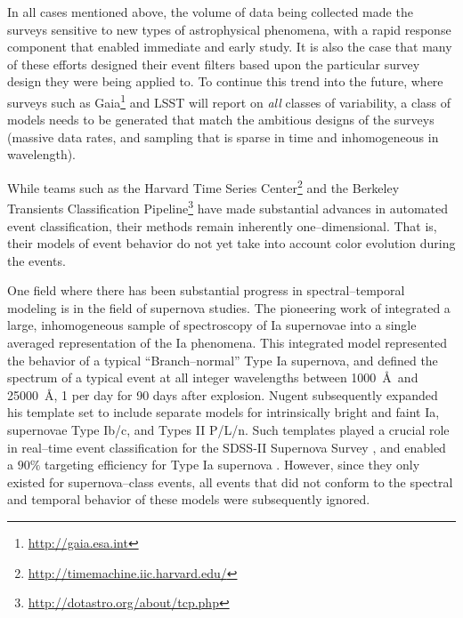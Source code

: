 In all cases mentioned above, the volume of data being collected made the
surveys sensitive to new types of astrophysical phenomena, with a rapid response
component that enabled immediate and early study.  It is also the case that many
of these efforts designed their event filters based upon the particular survey
design they were being applied to.  To continue this trend into the future,
where surveys such as Gaia\footnote{\url{http://gaia.esa.int}} and LSST will
report on {\it all} classes of variability, a class of models needs to be
generated that match the ambitious designs of the surveys (massive data rates,
and sampling that is sparse in time and inhomogeneous in wavelength).

 \smallskip

While teams such as the Harvard Time Series
Center\footnote{\url{http://timemachine.iic.harvard.edu/}} and the Berkeley
Transients Classification
Pipeline\footnote{\url{http://dotastro.org/about/tcp.php}} have made substantial
advances in automated event classification, their methods remain inherently
one--dimensional. That is, their models of event behavior do not yet take into
account color evolution during the events.

One field where there has been substantial progress in spectral--temporal
modeling is in the field of supernova studies. The pioneering work of
\cite{2002PASP..114..803N} integrated a large, inhomogeneous sample of
spectroscopy of Ia supernovae into a single averaged representation of the Ia
phenomena. This integrated model represented the behavior of a typical
``Branch--normal'' Type Ia supernova, and defined the spectrum of a typical
event at all integer wavelengths between 1000~\AA~and 25000~\AA, 1 per day for
90 days after explosion.  Nugent subsequently expanded his template set to
include separate models for intrinsically bright and faint Ia, supernovae Type
Ib/c, and Types II P/L/n. Such templates played a crucial role in real--time
event classification for the SDSS-II Supernova Survey
\citep{2008AJ....135..338F}, and enabled a $90\%$ targeting efficiency for Type
Ia supernova \citep{2008AJ....135..348S}. However, since they only existed for
supernova--class events, all events that did not conform to the spectral and
temporal behavior of these models were subsequently ignored.


